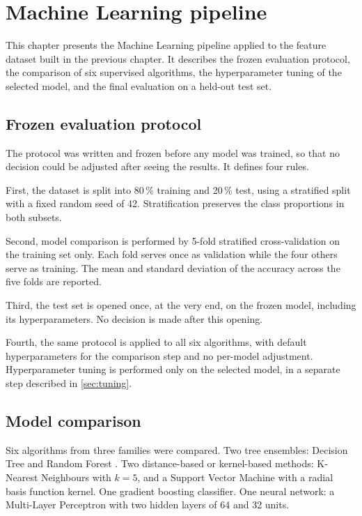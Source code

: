 \chapter{Machine Learning pipeline}
\label{ch:ml}

This chapter presents the Machine Learning pipeline applied to the feature dataset built in the previous chapter. It describes the frozen evaluation protocol, the comparison of six supervised algorithms, the hyperparameter tuning of the selected model, and the final evaluation on a held-out test set.

\section{Frozen evaluation protocol}

The protocol was written and frozen before any model was trained, so that no decision could be adjusted after seeing the results. It defines four rules.

First, the dataset is split into 80\,\% training and 20\,\% test, using a stratified split with a fixed random seed of 42. Stratification preserves the class proportions in both subsets.

Second, model comparison is performed by 5-fold stratified cross-validation on the training set only. Each fold serves once as validation while the four others serve as training. The mean and standard deviation of the accuracy across the five folds are reported.

Third, the test set is opened once, at the very end, on the frozen model, including its hyperparameters. No decision is made after this opening.

Fourth, the same protocol is applied to all six algorithms, with default hyperparameters for the comparison step and no per-model adjustment. Hyperparameter tuning is performed only on the selected model, in a separate step described in \cref{sec:tuning}.

\section{Model comparison}
\label{sec:comparison}

Six algorithms from three families were compared. Two tree ensembles: Decision Tree and Random Forest \cite{breiman2001random}. Two distance-based or kernel-based methods: K-Nearest Neighbours with \(k = 5\), and a Support Vector Machine with a radial basis function kernel. One gradient boosting classifier. One neural network: a Multi-Layer Perceptron with two hidden layers of 64 and 32 units.

